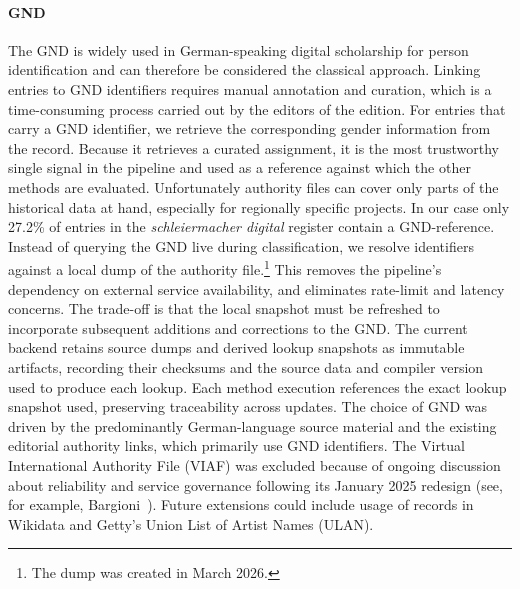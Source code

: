 \documentclass{eceasst}
\begin{document}
\paragraph{GND} The GND is widely used in German-speaking digital scholarship for person identification and can therefore be considered the classical approach. Linking entries to GND identifiers requires manual annotation and curation, which is a time-consuming process carried out by the editors of the edition. For entries that carry a GND identifier, we retrieve the corresponding gender information from the record. Because it retrieves a curated assignment, it is the most trustworthy single signal in the pipeline and used as a reference against which the other methods are evaluated. Unfortunately authority files can cover only parts of the historical data at hand, especially for regionally specific projects. In our case only 27.2\% of entries in the \textit{schleiermacher digital} register contain a GND-reference. Instead of querying the GND live during classification, we resolve identifiers against a local dump of the authority file.\footnote{The dump was created in March 2026.} This removes the pipeline's dependency on external service availability, and eliminates rate-limit and latency concerns.
The trade-off is that the local snapshot must be refreshed to incorporate subsequent additions and corrections to the GND. The current backend retains source dumps and derived lookup snapshots as immutable artifacts, recording their checksums and the source data and compiler version used to produce each lookup. Each method execution references the exact lookup snapshot used, preserving traceability across updates.
The choice of GND was driven by the predominantly German-language source material and the existing editorial authority links, which primarily use GND identifiers. The Virtual International Authority File (VIAF) was excluded because of ongoing discussion about reliability and service governance following its January 2025 redesign (see, for example, Bargioni~\cite{bargioni_viaf_2025}). Future extensions could include usage of records in Wikidata and Getty's Union List of Artist Names (ULAN).
\end{document}
